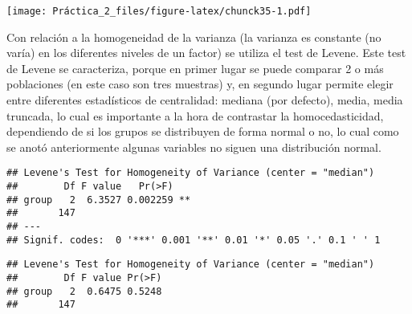 \documentclass[
]{article}
\newenvironment{Shaded}{\begin{snugshade}}{\end{snugshade}}
\newcommand{\AttributeTok}[1]{\textcolor[rgb]{0.77,0.63,0.00}{#1}}
\newcommand{\CommentTok}[1]{\textcolor[rgb]{0.56,0.35,0.01}{\textit{#1}}}
\newcommand{\FunctionTok}[1]{\textcolor[rgb]{0.00,0.00,0.00}{#1}}
\newcommand{\NormalTok}[1]{#1}
\newcommand{\SpecialCharTok}[1]{\textcolor[rgb]{0.00,0.00,0.00}{#1}}
\newcommand{\StringTok}[1]{\textcolor[rgb]{0.31,0.60,0.02}{#1}}
\begin{document}
\texttt{[image: Práctica\_2\_files/figure-latex/chunck35-1.pdf]}

Con relación a la homogeneidad de la varianza (la varianza es constante
(no varía) en los diferentes niveles de un factor) se utiliza el test de
Levene. Este test de Levene se caracteriza, porque en primer lugar se
puede comparar 2 o más poblaciones (en este caso son tres muestras) y,
en segundo lugar permite elegir entre diferentes estadísticos de
centralidad: mediana (por defecto), media, media truncada, lo cual es
importante a la hora de contrastar la homocedasticidad, dependiendo de
si los grupos se distribuyen de forma normal o no, lo cual como se anotó
anteriormente algunas variables no siguen una distribución normal.

\begin{Shaded}
\end{Shaded}

\begin{verbatim}
## Levene's Test for Homogeneity of Variance (center = "median")
##        Df F value   Pr(>F)   
## group   2  6.3527 0.002259 **
##       147                    
## ---
## Signif. codes:  0 '***' 0.001 '**' 0.01 '*' 0.05 '.' 0.1 ' ' 1
\end{verbatim}

\begin{Shaded}
\end{Shaded}

\begin{verbatim}
## Levene's Test for Homogeneity of Variance (center = "median")
##        Df F value Pr(>F)
## group   2  0.6475 0.5248
##       147
\end{verbatim}

\begin{Shaded}
\end{Shaded}
\end{document}

